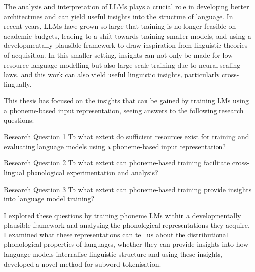 The analysis and interpretation of LLMs plays a crucial role in developing better architectures and can yield useful insights into the structure of language. In recent years, LLMs have grown so large that training is no longer feasible on academic budgets, leading to a shift towards training smaller models, and using a developmentally plausible framework to draw inspiration from linguistic theories of acquisition. In this smaller setting, insights can not only be made for low-resource language modelling but also large-scale training due to neural scaling laws, and this work can also yield useful linguistic insights, particularly cross-lingually.

This thesis has focused on the insights that can be gained by training LMs using a phoneme-based input representation, seeing answers to the following research questions:

\begin{question*}{Research Question 1}
    To what extent do sufficient resources exist for training and evaluating language models using a phoneme-based input representation?
\end{question*}

\begin{question*}{Research Question 2}
    To what extent can phoneme-based training facilitate cross-lingual phonological experimentation and analysis?
\end{question*}

\begin{question*}{Research Question 3}
    To what extent can phoneme-based training provide insights into language model training?
\end{question*}

I explored these questions by training phoneme LMs within a developmentally plausible framework and analysing the phonological representations they acquire. I examined what these representations can tell us about the distributional phonological properties of languages, whether they can provide insights into how language models internalise linguistic structure and using these insights, developed a novel method for subword tokenisation. %

